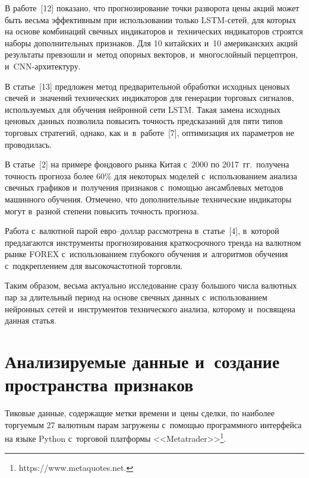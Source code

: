 {\begin{multicols}{2}
  В работе~[12] показано, что прогнозирование точки разворота цены акций может быть 
весьма эффективным при использовании только LSTM-се\-тей, для которых на основе 
комбинаций свечных индикаторов и~технических индикаторов строятся наборы 
дополнительных признаков. Для 10 китайских и~10 американских акций результаты 
превзошли и~метод опорных векторов, и~многослойный перцептрон,  
и~CNN-ар\-хи\-тек\-туру.
  
  В статье~[13] предложен метод предварительной обработки исходных ценовых свечей 
  и~значений технических индикаторов для генерации торговых сигналов, используемых для 
обучения нейронной сети LSTM. Такая замена исходных ценовых данных позволила 
повысить точность предсказаний для пяти типов торговых стратегий, однако, как 
и~в~работе~[7], оптимизация их параметров не проводилась.
  
  В статье~[2] на примере фондового рынка Китая с~2000 по 2017~гг.\ получена точность 
прогноза более 60\% для некоторых моделей с~использованием анализа свечных графиков 
и~получения признаков с~помощью ансамблевых методов машинного обуче\-ния. Отмечено, что 
дополнительные технические индикаторы могут в~разной степени повысить точ\-ность 
прогноза. 
  
  Работа с~валютной парой ев\-ро--дол\-лар рас\-смот\-ре\-на в~статье~[4], в~которой 
предлагаются инструменты прогнозирования краткосрочного тренда на валютном рынке 
FOREX с~использованием глубокого обучения и~алгоритмов обучения с~подкреплением для 
высокочастотной торговли.
  
  Таким образом, весьма актуально исследование сразу большого числа валютных пар за 
длительный период на основе свечных данных с~использованием нейронных сетей 
и~инструментов технического анализа, которому и~посвящена данная статья.


   
   \vspace*{-12pt}

\section{Анализируемые данные и~создание пространства признаков}

\vspace*{-2pt}

Тиковые данные, содержащие метки времени и~цены сделки, по наиболее торгуемым 27 валютным парам 
загружены с~помощью программного интерфейса на языке Python с~торговой платформы 
<<Metatrader>>\footnote{{\sf https://www.metaquotes.net}.}. 


\end{multicols}}

